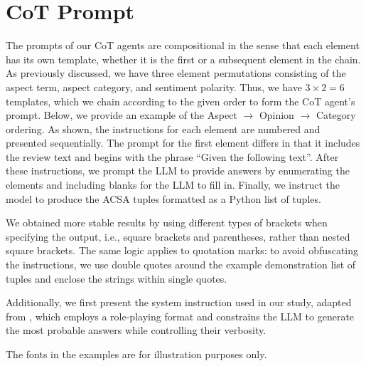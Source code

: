 \documentclass[11pt]{article}
\begin{document}
\section{CoT Prompt}
\label{sec:appendix:cot_prompts}
The prompts of our CoT agents are compositional in the sense that each element has its own template, whether it is the first or a subsequent element in the chain. As previously discussed, we have three element permutations consisting of the aspect term, aspect category, and sentiment polarity. Thus, we have $3 \times 2 = 6$ templates, which we chain according to the given order to form the CoT agent's prompt. Below, we provide an example of the Aspect $\rightarrow$ Opinion $\rightarrow$ Category ordering. As shown, the instructions for each element are numbered and presented sequentially. The prompt for the first element differs in that it includes the review text and begins with the phrase ``Given the following text''. After these instructions, we prompt the LLM to provide answers by enumerating the elements and including blanks for the LLM to fill in. Finally, we instruct the model to produce the ACSA tuples formatted as a Python list of tuples. 

We obtained more stable results by using different types of brackets when specifying the output, i.e., square brackets and parentheses, rather than nested square brackets. The same logic applies to quotation marks: to avoid obfuscating the instructions, we use double quotes around the example demonstration list of tuples and enclose the strings within single quotes.

Additionally, we first present the system instruction used in our study, adapted from \citep{10499502}, which employs a role-playing format and constrains the LLM to generate the most probable answers while controlling their verbosity.

The fonts in the examples are for illustration purposes only.

\vspace{1em}
\end{document}
